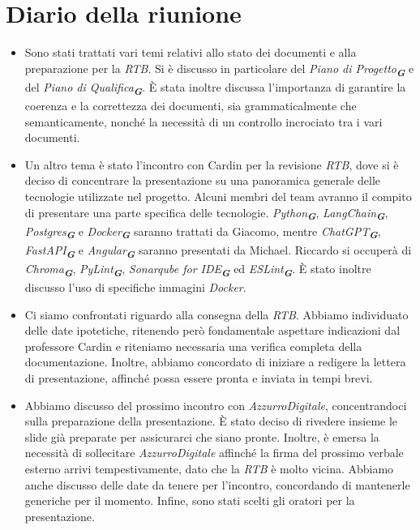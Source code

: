 
\section{Diario della riunione}

\begin{itemize}
    \item Sono stati trattati vari temi relativi allo stato dei documenti e alla preparazione per la \emph{RTB}. Si è discusso in particolare del \emph{Piano di Progetto}\textsubscript{\textit{\textbf{G}}} e del \emph{Piano di Qualifica}\textsubscript{\textit{\textbf{G}}}. È stata inoltre discussa l'importanza di garantire la coerenza e la correttezza dei documenti, sia grammaticalmente che semanticamente, nonché la necessità di un controllo incrociato tra i vari documenti.

    \item Un altro tema è stato l'incontro con Cardin per la revisione \emph{RTB}, dove si è deciso di concentrare la presentazione su una panoramica generale delle tecnologie utilizzate nel progetto. Alcuni membri del team avranno il compito di presentare una parte specifica delle tecnologie. \emph{Python}\textsubscript{\textit{\textbf{G}}}, \emph{LangChain}\textsubscript{\textit{\textbf{G}}}, \emph{Postgres}\textsubscript{\textit{\textbf{G}}} e \emph{Docker}\textsubscript{\textit{\textbf{G}}} saranno trattati da Giacomo, mentre \emph{ChatGPT}\textsubscript{\textit{\textbf{G}}}, \emph{FastAPI}\textsubscript{\textit{\textbf{G}}} e \emph{Angular}\textsubscript{\textit{\textbf{G}}} saranno presentati da Michael. Riccardo si occuperà di \emph{Chroma}\textsubscript{\textit{\textbf{G}}}, \emph{PyLint}\textsubscript{\textit{\textbf{G}}}, \emph{Sonarqube for IDE}\textsubscript{\textit{\textbf{G}}} ed \emph{ESLint}\textsubscript{\textit{\textbf{G}}}. È stato inoltre discusso l'uso di specifiche immagini \emph{Docker}.

    \item Ci siamo confrontati riguardo alla consegna della \emph{RTB}. Abbiamo individuato delle date ipotetiche, ritenendo però fondamentale aspettare indicazioni dal professore Cardin e riteniamo necessaria una verifica completa della documentazione. Inoltre, abbiamo concordato di iniziare a redigere la lettera di presentazione, affinché possa essere pronta e inviata in tempi brevi.

    \item Abbiamo discusso del prossimo incontro con \emph{AzzurroDigitale}, concentrandoci sulla preparazione della presentazione. È stato deciso di rivedere insieme le slide già preparate per assicurarci che siano pronte. Inoltre, è emersa la necessità di sollecitare \emph{AzzurroDigitale} affinché la firma del prossimo verbale esterno arrivi tempestivamente, dato che la \emph{RTB} è molto vicina.
    Abbiamo anche discusso delle date da tenere per l'incontro, concordando di mantenerle generiche per il momento. Infine, sono stati scelti gli oratori per la presentazione.
\end{itemize}
